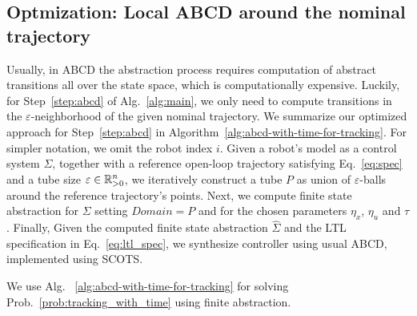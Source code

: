 \subsection{Optmization: Local ABCD around the nominal trajectory}
Usually, in ABCD the abstraction process requires computation of abstract transitions all over the state space, which is computationally expensive.
Luckily, for Step~\ref{step:abcd} of Alg.~\ref{alg:main}, we only need to compute transitions in the $\varepsilon$-neighborhood of the given nominal trajectory.
We summarize our optimized approach for Step~\ref{step:abcd} in Algorithm~\ref{alg:abcd-with-time-for-tracking}.
For simpler notation, we omit the robot index $i$.
Given a robot's model as a control system $\Sigma$, together with a reference open-loop trajectory satisfying Eq.~\eqref{eq:spec} and a tube size $\varepsilon\in \mathbb{R}_{>0}^n$, we iteratively construct a tube $P$ as union of $\varepsilon$-balls around the reference trajectory's points. 
Next, we compute finite state abstraction for $\Sigma$ setting $Domain=P$ and for the chosen parameters $\eta_x$, $\eta_u$ and $\tau$. 
Finally, Given the computed finite state abstraction $\widehat \Sigma$ and the LTL specification in Eq.~\eqref{eq:ltl_spec}, we synthesize controller using usual ABCD, implemented using SCOTS. 

We use Alg.~ \ref{alg:abcd-with-time-for-tracking} for solving Prob.~\ref{prob:tracking_with_time} using finite abstraction.




